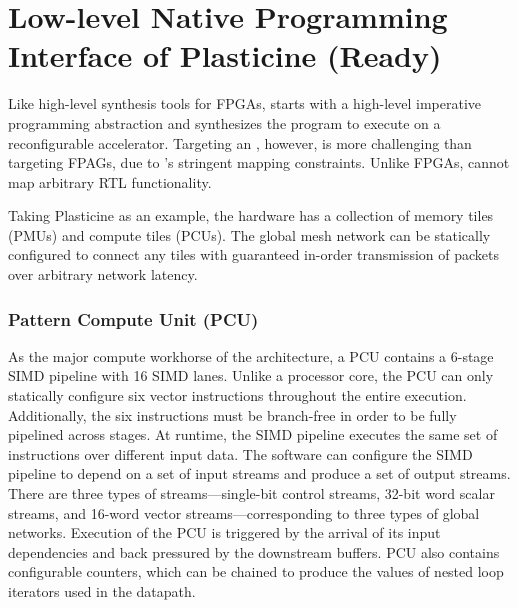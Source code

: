\section{Low-level Native Programming Interface of Plasticine (Ready)}
Like high-level synthesis tools for FPGAs, \name starts with a high-level imperative programming
abstraction and synthesizes the program to execute on a reconfigurable accelerator. Targeting an \rda, however,
is more challenging than targeting FPAGs, due to \rda's stringent mapping constraints. 
Unlike FPGAs, \rdas cannot map arbitrary RTL functionality. 

Taking Plasticine as an example, 
the hardware has a collection of memory tiles (PMUs) and compute tiles (PCUs). 
The global mesh network can be statically configured to connect any tiles with guaranteed in-order 
transmission of packets over arbitrary network latency.

\subsubsection{Pattern Compute Unit (PCU)}
As the major compute workhorse of the architecture, a PCU contains a 6-stage SIMD pipeline with 16 SIMD lanes. 
Unlike a processor core, the PCU can only statically configure six vector instructions throughout the
entire execution.
Additionally, the six instructions must be branch-free in order to be fully pipelined across stages.
At runtime, the SIMD pipeline executes the same set of instructions over different input data.
The software can configure the SIMD pipeline to depend on a set of input streams and
produce a set of output streams. 
There are three types of streams---single-bit control streams, 32-bit word scalar streams, and
16-word vector streams---corresponding to three types of global networks.
Execution of the PCU is triggered by the arrival of its input dependencies and back pressured by
the downstream buffers.
PCU also contains configurable counters, which can be chained to produce the values of nested
loop iterators used in the datapath. 


